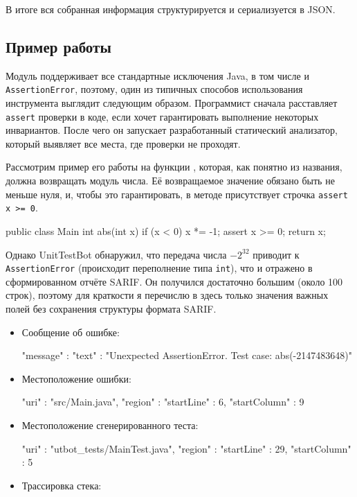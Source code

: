В итоге вся собранная информация структурируется и сериализуется в JSON.


\subsection{Пример работы}

Модуль поддерживает все стандартные исключения Java, в том числе и \verb|AssertionError|, поэтому, один из типичных способов использования инструмента выглядит следующим образом. Программист сначала расставляет \verb|assert| проверки в коде, если хочет гарантировать выполнение некоторых инвариантов. После чего он запускает разработанный статический анализатор, который выявляет все места, где проверки не проходят.

Рассмотрим пример его работы на функции , которая, как понятно из названия, должна возвращать модуль числа. Её возвращаемое значение обязано быть не меньше нуля, и, чтобы это гарантировать, в методе присутствует строчка \verb|assert x >= 0|.

\begin{code}
public class Main {
    int abs(int x) {
        if (x < 0) {
            x *= -1;
        }
        assert x >= 0;
        return x;
    }
}
\end{code}

Однако UnitTestBot обнаружил, что передача числа $-2^{32}$ приводит к \verb|AssertionError| (происходит переполнение типа \verb|int|), что и отражено в сформированном отчёте SARIF. Он получился достаточно большим (около 100 строк), поэтому для краткости я перечислю в здесь только значения важных полей без сохранения структуры формата SARIF.

\begin{itemize}
    \item Сообщение об ошибке:

\begin{zerocode}
"message" : {
  "text" : "Unexpected AssertionError.
            Test case: abs(-2147483648)"
}
\end{zerocode}

    \item Местоположение ошибки:

\begin{zerocode}
"uri" : "src/Main.java",
"region" : {
  "startLine" : 6,
  "startColumn" : 9
}
\end{zerocode}

    \item Местоположение сгенерированного теста:

\begin{zerocode}
"uri" : "utbot_tests/MainTest.java",
"region" : {
  "startLine" : 29,
  "startColumn" : 5
}
\end{zerocode}

    \item Трассировка стека:

\begin{zerocode}
\end{zerocode}

\end{itemize}
